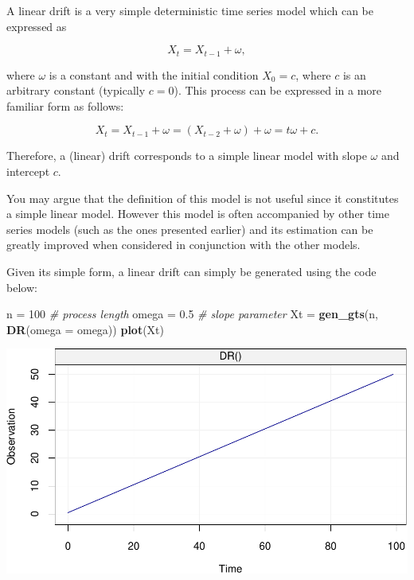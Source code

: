 \documentclass[]{book}
\newenvironment{Shaded}{\begin{snugshade}}{\end{snugshade}}
\newcommand{\KeywordTok}[1]{\textcolor[rgb]{0.13,0.29,0.53}{\textbf{#1}}}
\newcommand{\DataTypeTok}[1]{\textcolor[rgb]{0.13,0.29,0.53}{#1}}
\newcommand{\DecValTok}[1]{\textcolor[rgb]{0.00,0.00,0.81}{#1}}
\newcommand{\FloatTok}[1]{\textcolor[rgb]{0.00,0.00,0.81}{#1}}
\newcommand{\StringTok}[1]{\textcolor[rgb]{0.31,0.60,0.02}{#1}}
\newcommand{\CommentTok}[1]{\textcolor[rgb]{0.56,0.35,0.01}{\textit{#1}}}
\newcommand{\NormalTok}[1]{#1}
\theoremstyle{definition}
\theoremstyle{definition}
\theoremstyle{definition}
\theoremstyle{remark}
\let\BeginKnitrBlock\begin \let\EndKnitrBlock\end
\begin{document}
A linear drift is a very simple deterministic time series model which
can be expressed as

\[X_t = X_{t-1} + \omega, \]

where \(\omega\) is a constant and with the initial condition
\(X_0 = c\), where \(c\) is an arbitrary constant (typically \(c = 0\)).
This process can be expressed in a more familiar form as follows:

\[
  {X_t} = {X_{t - 1}} + \omega 
   = \left( {{X_{t - 2}} + \omega} \right) + \omega 
   = t{\omega} + c . \]

Therefore, a (linear) drift corresponds to a simple linear model with
slope \(\omega\) and intercept \(c\).

\BeginKnitrBlock{exercise}
\protect\hypertarget{exr:remdrift}{}{\label{exr:remdrift} }You may argue
that the definition of this model is not useful since it constitutes a
simple linear model. However this model is often accompanied by other
time series models (such as the ones presented earlier) and its
estimation can be greatly improved when considered in conjunction with
the other models.
\EndKnitrBlock{exercise}

Given its simple form, a linear drift can simply be generated using the
code below:

\begin{Shaded}
\begin{Highlighting}[]
\NormalTok{n =}\StringTok{ }\DecValTok{100}                               \CommentTok{# process length}
\NormalTok{omega =}\StringTok{ }\FloatTok{0.5}                           \CommentTok{# slope parameter}
\NormalTok{Xt =}\StringTok{ }\KeywordTok{gen_gts}\NormalTok{(n, }\KeywordTok{DR}\NormalTok{(}\DataTypeTok{omega =}\NormalTok{ omega))}
\KeywordTok{plot}\NormalTok{(Xt)}
\end{Highlighting}
\end{Shaded}

\includegraphics{ts_files/figure-latex/example_Drift-1.pdf}
\end{document}
